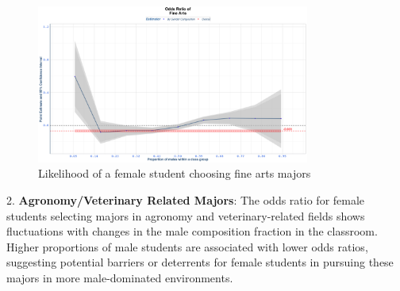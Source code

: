 \begin{figure}[H]
\centering
\includegraphics[width=0.8\textwidth]{Graph/Results/fe_panel_student_gender_composition_wome_in_FINE_ARTS_bce.png}
\caption{Likelihood of a female student choosing fine arts majors}
\label{fig:fine_arts}
\end{figure}

2. \textbf{Agronomy/Veterinary Related Majors}: The odds ratio for female students selecting majors in agronomy and veterinary-related fields shows fluctuations with changes in the male composition fraction in the classroom. Higher proportions of male students are associated with lower odds ratios, suggesting potential barriers or deterrents for female students in pursuing these majors in more male-dominated environments.

